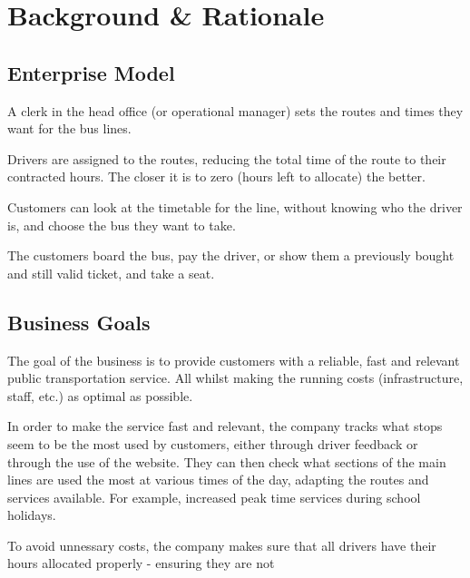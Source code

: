 \chapter{Background \& Rationale}

\section{Enterprise Model}

A clerk in the head office (or operational manager) sets the routes and times they want for the bus lines.

Drivers are assigned to the routes, reducing the total time of the route to their contracted hours. The closer it is to zero (hours left to allocate) the better.

Customers can look at the timetable for the line, without knowing who the driver is, and choose the bus they want to take.

The customers board the bus, pay the driver, or show them a previously bought and still valid ticket, and take a seat.

\section{Business Goals}

The goal of the business is to provide customers with a reliable, fast and relevant public transportation service. All whilst making the running costs (infrastructure, staff, etc.) as optimal as possible.

In order to make the service fast and relevant, the company tracks what stops seem to be the most used by customers, either through driver feedback or through the use of the website. They can then check what sections of the main lines are used the most at various times of the day, adapting the routes and services available. For example, increased peak time services during school holidays.

To avoid unnessary costs, the company makes sure that all drivers have their hours allocated properly - ensuring they are not 